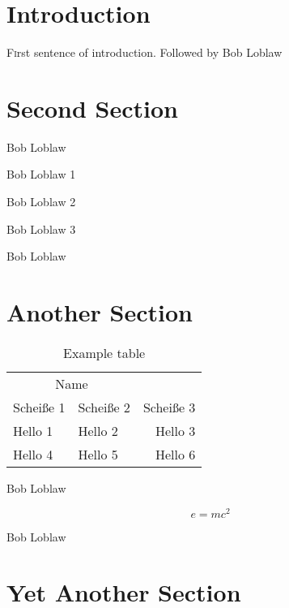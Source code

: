 \documentclass[twoside]{article}
\begin{document}
\begin{multicols}{2} %

\section{Introduction}

\lettrine[nindent=0em,lines=3]{F} irst sentence of introduction.
Followed by Bob Loblaw


\section{Second Section}

Bob Loblaw
\begin{compactitem}
\item{Bob Loblaw 1}
\item{Bob Loblaw 2}
\item{Bob Loblaw 3}
\end{compactitem}
Bob Loblaw


\section{Another Section}

\begin{table}[H]
\caption{Example table}
\centering
\begin{tabular}{llr}
\toprule
\multicolumn{2}{c}{Name} \\
\cmidrule(r){1-2}
Scheiße 1 & Scheiße 2 & Scheiße 3 \\
\midrule
Hello 1 & Hello 2 & Hello 3 \\
Hello 4 & Hello 5 & Hello 6 \\
\bottomrule
\end{tabular}
\end{table}

Bob Loblaw

\begin{equation}
\label{eq:emc}
e = mc^2
\end{equation}

Bob Loblaw


\section{Yet Another Section}


\end{multicols}
\end{document}

